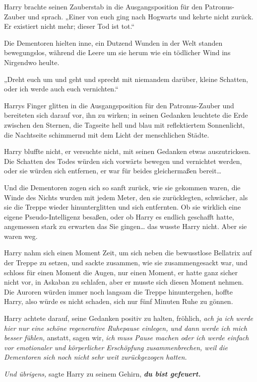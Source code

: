 {Harry brachte seinen Zauberstab in die Ausgangsposition für den Patronus-Zauber und sprach. „Einer von euch ging nach Hogwarts und kehrte nicht zurück. Er existiert nicht mehr; dieser Tod ist tot.“

Die Dementoren hielten inne, ein Dutzend Wunden in der Welt standen bewegungslos, während die Leere um sie herum wie ein tödlicher Wind ins Nirgendwo heulte.

„Dreht euch um und geht und sprecht mit niemandem darüber, kleine Schatten, oder ich werde auch euch vernichten.“

Harrys Finger glitten in die Ausgangsposition für den Patronus-Zauber und bereiteten sich darauf vor, ihn zu wirken; in seinen Gedanken leuchtete die Erde zwischen den Sternen, die Tagseite hell und blau mit reflektiertem Sonnenlicht, die Nachtseite schimmernd mit dem Licht der menschlichen Städte.

Harry bluffte nicht, er versuchte nicht, mit seinen Gedanken etwas auszutricksen. Die Schatten des Todes würden sich vorwärts bewegen und vernichtet werden, oder sie würden sich entfernen, er war für beides gleichermaßen bereit…

Und die Dementoren zogen sich so sanft zurück, wie sie gekommen waren, die Winde des Nichts wurden mit jedem Meter, den sie zurücklegten, schwächer, als sie die Treppe wieder hinunterglitten und sich entfernten. Ob sie wirklich eine eigene Pseudo-Intelligenz besaßen, oder ob Harry es endlich geschafft hatte, angemessen stark zu erwarten das Sie gingen… das wusste Harry nicht. Aber sie waren weg.

Harry nahm sich einen Moment Zeit, um sich neben die bewusstlose Bellatrix auf der Treppe zu setzen, und sackte zusammen, wie sie zusammengesackt war, und schloss für einen Moment die Augen, nur einen Moment, er hatte ganz sicher nicht vor, in Askaban zu schlafen, aber er musste sich diesen Moment nehmen. Die Auroren würden immer noch langsam die Treppe hinuntergehen, hoffte Harry, also würde es nicht schaden, sich nur fünf Minuten Ruhe zu gönnen.

Harry achtete darauf, seine Gedanken positiv zu halten, fröhlich, \emph{ach ja ich werde hier nur eine schöne regenerative Ruhepause einlegen, und dann werde ich mich besser fühlen,} anstatt, sagen wir, \emph{ich muss Pause machen oder ich werde einfach vor emotionaler und körperlicher Erschöpfung zusammenbrechen, weil die Dementoren sich noch nicht sehr weit zurückgezogen hatten.}

\emph{Und übrigens,} sagte Harry zu seinem Gehirn, \textbf{\emph{du bist gefeuert.}}

}
